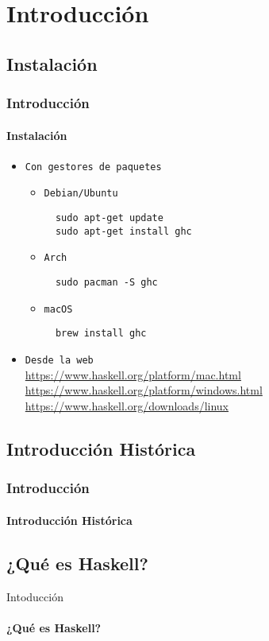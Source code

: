 \section{Introducción}
\subsection{Instalación}
\begin{frame}[fragile]
  \frametitle{Introducción}
  \framesubtitle{Instalación}
  \begin{itemize}
  \item\texttt{Con gestores de paquetes}
    \begin{itemize}
    \item\texttt{Debian/Ubuntu}
      {\color{white}
        \begin{verbatim}
  sudo apt-get update
  sudo apt-get install ghc
        \end{verbatim}
      }
    \item\texttt{Arch}
      {\color{white}
        \begin{verbatim}
  sudo pacman -S ghc
        \end{verbatim}
      }
    \item\texttt{macOS}
      {\color{white}
        \begin{verbatim}
  brew install ghc
        \end{verbatim}
      }
    \end{itemize}
  \item\texttt{Desde la web}\\
    \url{https://www.haskell.org/platform/mac.html}\\
    \url{https://www.haskell.org/platform/windows.html}\\
    \url{https://www.haskell.org/downloads/linux}
  \end{itemize}
\end{frame}

\subsection{Introducción Histórica}
\begin{frame}[fragile]          %
  \frametitle{Introducción}
  \framesubtitle{Introducción Histórica}

\end{frame}

\subsection{¿Qué es Haskell?}
\begin{frame}{Intoducción}      %
  \framesubtitle{¿Qué es Haskell?}

\end{frame}
